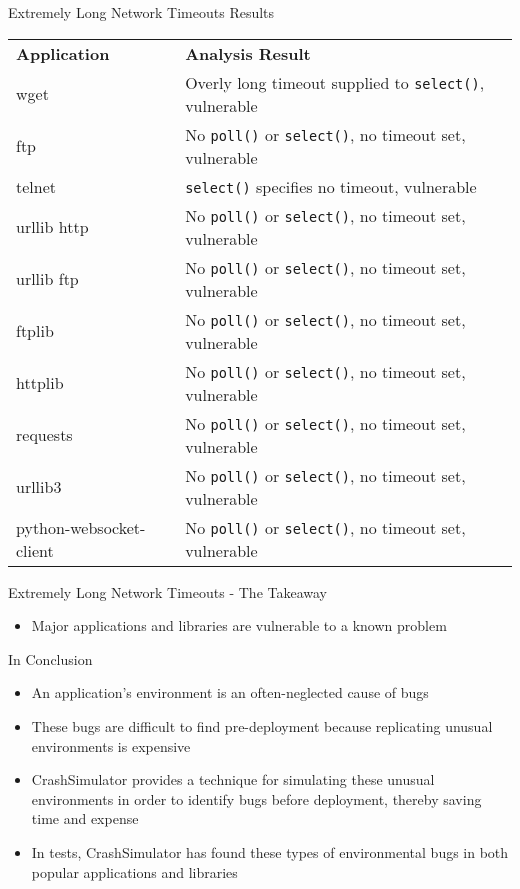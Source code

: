 \documentclass[pdf]{beamer}
\begin{document}
\begin{frame}{Extremely Long Network Timeouts Results}
  \tiny{}
  \begin{tabular}{l | l}
    {\bf Application}              & {\bf Analysis Result}\\
    wget                     & Overly long timeout supplied to {\tt select()}, vulnerable\\
    ftp                      & No {\tt poll()} or {\tt select()}, no timeout set, vulnerable\\
    telnet                   & {\tt select()} specifies no timeout, vulnerable\\
    urllib http              & No {\tt poll()} or {\tt select()}, no timeout set, vulnerable\\
    urllib ftp               & No {\tt poll()} or {\tt select()}, no timeout set, vulnerable\\
    ftplib                   & No {\tt poll()} or {\tt select()}, no timeout set, vulnerable\\
    httplib                  & No {\tt poll()} or {\tt select()}, no timeout set, vulnerable\\
    requests                 & No {\tt poll()} or {\tt select()}, no timeout set, vulnerable\\
    urllib3                  & No {\tt poll()} or {\tt select()}, no timeout set, vulnerable\\
    python-websocket-client  & No {\tt poll()} or {\tt select()}, no timeout set, vulnerable\\
  \end{tabular}
\end{frame}


\begin{frame}{Extremely Long Network Timeouts - The Takeaway}
  \begin{itemize}
    \item{Major applications and libraries are vulnerable to a known
      problem}
  \end{itemize}
\end{frame}


\begin{frame}{In Conclusion}
  \begin{itemize}
  \item{An application's environment is an often-neglected cause of bugs}
  \item{These bugs are difficult to find pre-deployment because replicating
      unusual environments is expensive}
  \item{CrashSimulator provides a technique for simulating these unusual
      environments in order to identify bugs before deployment, thereby
      saving time and expense}
  \item{In tests, CrashSimulator has found these types of environmental bugs in
      both popular applications and libraries}
  \end{itemize}
\end{frame}
\end{document}
